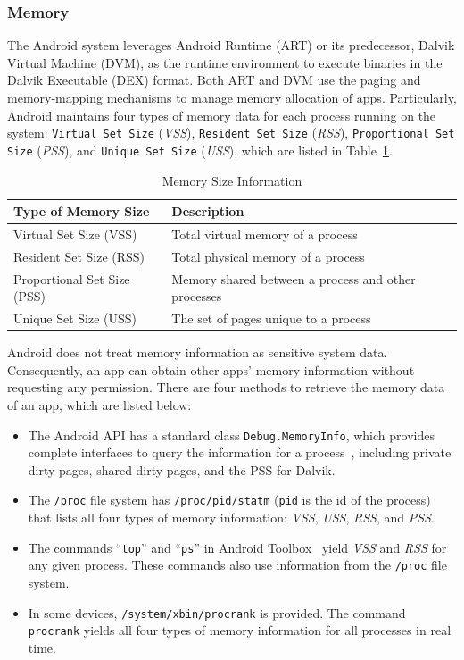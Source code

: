 \documentclass[letterpaper,12pt]{article}
\begin{document}
\subsubsection{Memory}
The Android system leverages Android Runtime (ART) or its predecessor, Dalvik Virtual Machine (DVM), as the runtime environment to execute binaries in the Dalvik Executable (DEX) format. Both ART and DVM use the paging and memory-mapping mechanisms \cite{androidmemoverview} to manage memory allocation of apps. Particularly, Android maintains four types of memory data for each process running on the system: \texttt{Virtual Set Size} (\emph{VSS}), \texttt{Resident Set Size} (\emph{RSS}), \texttt{Proportional Set Size} (\emph{PSS}), and \texttt{Unique Set Size} (\emph{USS}), which are listed in Table~\ref{tab:memory}.

\begin{table}[h]
\centering
    \caption{Memory Size Information}
\begin{tabular}{|l|p{4.5cm}|}
    \hline\hline 
    \textbf{Type of Memory Size} & \textbf{Description} \\ 
    \hline\hline 
    \small Virtual Set Size (VSS) & \small Total virtual memory of a process \\ 
    \hline 
    \small Resident Set Size (RSS) & \small Total physical memory of a process \\ 
    \hline 
    \small Proportional Set Size (PSS) & \small Memory shared between a process and other processes \\ 
    \hline 
    \small Unique Set Size (USS) & \small  The set of pages unique to a process\\ 
    \hline 

\end{tabular} 
        \label{tab:memory}
\end{table}

Android does not treat memory information as sensitive
system data. Consequently, an app can obtain other apps' memory
information without requesting any permission. There are four methods to retrieve
the memory data of an app, which are listed below:
%
\begin{itemize}
\item The Android API has a standard class \texttt{Debug.MemoryInfo},
  which provides complete interfaces to query the information for
  a process~\cite{apimem}, including private dirty pages, shared dirty
  pages, and the PSS for Dalvik.
\item The \texttt{/proc} file system has \texttt{/proc/pid/statm}
  (\texttt{pid} is the id of the process) that lists all four types of
  memory information: \emph{VSS}, \emph{USS}, \emph{RSS}, and \emph{PSS}.
\item The commands ``\texttt{top}'' and ``\texttt{ps}'' in Android
  Toolbox~\cite{toolbox} yield \emph{VSS} and \emph{RSS} for any given
  process. These commands also use information from the \texttt{/proc}
  file system.
\item In some devices, \texttt{/system/xbin/procrank} is provided.
  The command\\ \texttt{procrank} yields all four types of memory
  information for all processes in real time.
\end{itemize}
\end{document}
